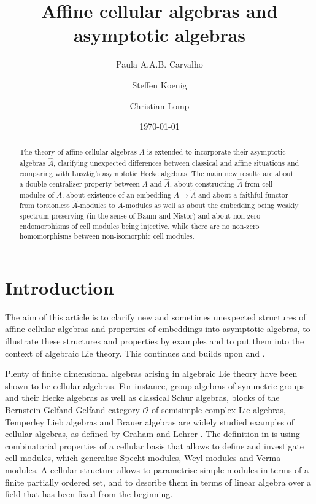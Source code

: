 \documentclass[oneside, a4paper, 11pt]{amsart}
\title{Affine cellular algebras and asymptotic algebras}
\author[P. Carvalho]{Paula A.A.B. Carvalho}
\author[S. Koenig]{Steffen Koenig}
\author[C. Lomp]{Christian Lomp}
\date{\today}
\begin{document}
\begin{abstract}
  The theory of affine cellular algebras $A$ is extended to incorporate
  their asymptotic algebras $\hat{A}$, clarifying unexpected differences
  between classical and affine situations and comparing with Lusztig's
  asymptotic Hecke algebras. The main new results are about a double
  centraliser property between $A$ and $\hat{A}$, about constructing
  $\hat{A}$ from cell modules of $A$, about existence of an embedding
  $A \rightarrow \hat{A}$ and about a faithful functor from torsionless
  $\hat{A}$-modules to $A$-modules as well as about the embedding being weakly
  spectrum preserving (in the sense of Baum and Nistor) and about
  non-zero endomorphisms of cell modules being injective, while there are
  no non-zero homomorphisms between non-isomorphic cell modules.
\end{abstract}

\maketitle

\tableofcontents

\section{Introduction}

The aim of this article is to clarify new and sometimes unexpected
structures of affine cellular algebras and properties of embeddings into
asymptotic algebras, to illustrate these structures and properties by examples
and to
put them into the context of algebraic Lie theory. This continues and builds
upon \cite{KXaffine} and \cite{CKLS}.

Plenty of finite dimensional algebras arising in algebraic Lie theory have
been shown to be cellular algebras. For instance, group algebras of symmetric
groups and their Hecke algebras as well as classical Schur algebras, blocks
of the Bernstein-Gelfand-Gelfand category $\mathcal O$ of semisimple complex
Lie algebras, Temperley Lieb algebras and Brauer algebras are widely studied
examples of cellular algebras, as defined by Graham and Lehrer
\cite{GrahamLehrer}. The definition in \cite{GrahamLehrer}
is using combinatorial properties of a cellular basis that
allows to define and investigate cell modules, which generalise Specht
modules, Weyl modules and Verma modules. A cellular structure allows to
parametrise simple modules in terms of a finite partially ordered set, and to
describe them in terms of linear algebra over a field that has been fixed
from the beginning. 
\end{document}
